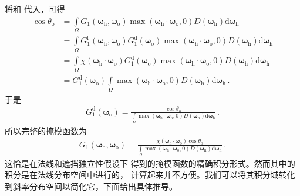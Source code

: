 将和
代入，可得
\begin{align}
    \cos\theta_{\mathrm{o}}
     & =\int\limits_{\varOmega}G_1({\bm\omega}_{\mathrm{h}},{\bm\omega}_{\mathrm{o}})
    \max({\bm\omega}_{\mathrm{h}}\cdot{\bm\omega}_{\mathrm{o}},0)
    D({\bm\omega}_{\mathrm{h}})\mathrm{d}{\bm\omega}_{\mathrm{h}}\nonumber                         \\
     & =\int\limits_{\varOmega}G_1^{\mathrm{l}}({\bm\omega}_{\mathrm{h}},{\bm\omega}_{\mathrm{o}})
    G_1^{\mathrm{d}}({\bm\omega}_{\mathrm{o}})
    \max({\bm\omega}_{\mathrm{h}}\cdot{\bm\omega}_{\mathrm{o}},0)
    D({\bm\omega}_{\mathrm{h}})\mathrm{d}{\bm\omega}_{\mathrm{h}}\nonumber                         \\
     & =\int\limits_{\varOmega}\chi({\bm\omega}_{\mathrm{h}}\cdot{\bm\omega}_{\mathrm{o}})
    G_1^{\mathrm{d}}({\bm\omega}_{\mathrm{o}})
    \max({\bm\omega}_{\mathrm{h}}\cdot{\bm\omega}_{\mathrm{o}},0)
    D({\bm\omega}_{\mathrm{h}})\mathrm{d}{\bm\omega}_{\mathrm{h}}\nonumber                         \\
     & =G_1^{\mathrm{d}}({\bm\omega}_{\mathrm{o}})\int\limits_{\varOmega}
    \max({\bm\omega}_{\mathrm{h}}\cdot{\bm\omega}_{\mathrm{o}},0)
    D({\bm\omega}_{\mathrm{h}})\mathrm{d}{\bm\omega}_{\mathrm{h}}\, .
\end{align}
于是
\begin{align}\label{eq:08-ex01-g1_distance}
    G_1^{\mathrm{d}}({\bm\omega}_{\mathrm{o}})
    =\frac{\cos\theta_{\mathrm{o}}}
    {\displaystyle\int\limits_{\varOmega}\max({\bm\omega}_{\mathrm{h}}\cdot{\bm\omega}_{\mathrm{o}},0)
    D({\bm\omega}_{\mathrm{h}})\mathrm{d}{\bm\omega}_{\mathrm{h}}}\, .
\end{align}
所以完整的掩模函数为
\begin{align}
    G_1({\bm\omega}_{\mathrm{h}},{\bm\omega}_{\mathrm{o}})
    =\frac{\chi({\bm\omega}_{\mathrm{h}}\cdot{\bm\omega}_{\mathrm{o}})\cos\theta_{\mathrm{o}}}
    {\displaystyle\int\limits_{\varOmega}\max({\bm\omega}_{\mathrm{h}}\cdot{\bm\omega}_{\mathrm{o}},0)
    D({\bm\omega}_{\mathrm{h}})\mathrm{d}{\bm\omega}_{\mathrm{h}}}\, .
\end{align}
这恰是\citet{10.1145/344779.344814}在法线和遮挡独立性假设下
得到的掩模函数的精确积分形式。然而其中的积分是在法线分布空间中进行的，
计算起来并不方便。我们可以将其积分域转化到斜率分布空间以简化它，下面给出具体推导。

